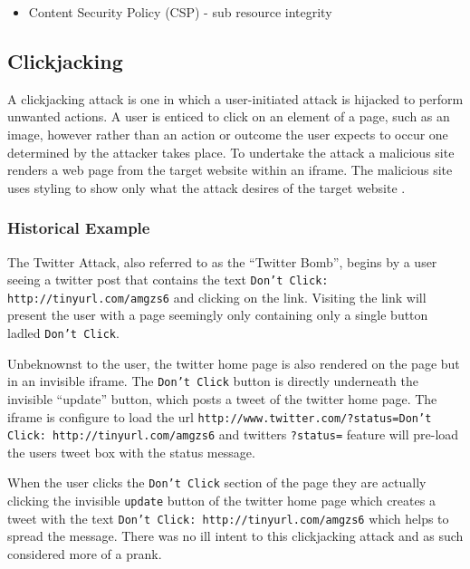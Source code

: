 \documentclass{mscreport}
\begin{document}
\begin{itemize}
	\setlength\itemsep{0.1em}
	\item Content Security Policy (CSP) - sub resource integrity
\end{itemize}

\subsection{Clickjacking}

A clickjacking attack is one in which a user-initiated attack is hijacked to perform unwanted actions. A user is enticed to click on an element of a page, such as an image, however rather than an action or outcome the user expects to occur one determined by the attacker takes place. To undertake the attack a malicious site renders a web page from the target website within an iframe. The malicious site uses styling to show only what the attack desires of the target website \cite{Jamwal2018-tz}.

\subsubsection{Historical Example}
The Twitter Attack, also referred to as the ``Twitter Bomb'', begins by a user seeing a twitter post that contains the text \texttt{Don't Click: http://tinyurl.com/amgzs6} \cite{Jani2015-kw} and clicking on the link. Visiting the link will present the user with a page seemingly only containing only a single button ladled \texttt{Don't Click}.

\vspace{0.3cm} \noindent
Unbeknownst to the user, the twitter home page is also rendered on the page but in an invisible iframe. The \texttt{Don't Click} button is directly underneath the invisible ``update'' button, which posts a tweet of the twitter home page. The iframe is configure to load the url \texttt{http://www.twitter.com/?status=Don't Click: http://tinyurl.com/amgzs6} \cite{Jani2015-kw} and twitters \texttt{?status=} feature will pre-load the users tweet box with the status message.

\vspace{0.3cm} \noindent
When the user clicks the \texttt{Don't Click} section of the page they are actually clicking the invisible \texttt{update} button of the twitter home page which creates a tweet with the text \texttt{Don’t Click: http://tinyurl.com/amgzs6} \cite{Jani2015-kw} which helps to spread the message. There was no ill intent to this clickjacking attack and as such considered more of a prank.
\end{document}
